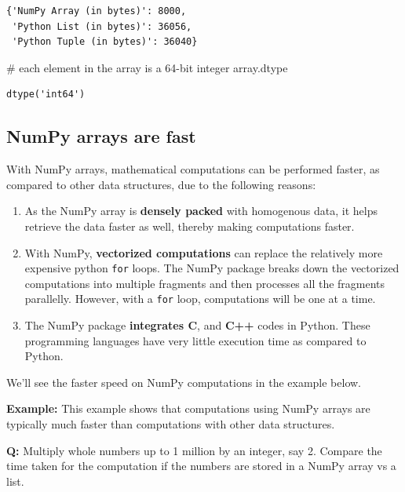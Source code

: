 \documentclass[
  letterpaper,
  DIV=11,
  numbers=noendperiod]{scrreprt}
\newenvironment{Shaded}{\begin{snugshade}}{\end{snugshade}}
\newcommand{\CommentTok}[1]{\textcolor[rgb]{0.37,0.37,0.37}{#1}}
\newcommand{\NormalTok}[1]{\textcolor[rgb]{0.00,0.23,0.31}{#1}}
\begin{document}
\begin{verbatim}
{'NumPy Array (in bytes)': 8000,
 'Python List (in bytes)': 36056,
 'Python Tuple (in bytes)': 36040}
\end{verbatim}

\begin{Shaded}
\begin{Highlighting}[]
\CommentTok{\# each element in the array is a 64{-}bit integer}
\NormalTok{array.dtype}
\end{Highlighting}
\end{Shaded}

\begin{verbatim}
dtype('int64')
\end{verbatim}

\hypertarget{numpy-arrays-are-fast}{%
\subsection{NumPy arrays are fast}\label{numpy-arrays-are-fast}}

With NumPy arrays, mathematical computations can be performed faster, as
compared to other data structures, due to the following reasons:

\begin{enumerate}
\def\labelenumi{\arabic{enumi}.}
\item
  As the NumPy array is \textbf{densely packed} with homogenous data, it
  helps retrieve the data faster as well, thereby making computations
  faster.
\item
  With NumPy, \textbf{vectorized computations} can replace the
  relatively more expensive python \texttt{for} loops. The NumPy package
  breaks down the vectorized computations into multiple fragments and
  then processes all the fragments parallelly. However, with a
  \texttt{for} loop, computations will be one at a time.
\item
  The NumPy package \textbf{integrates C}, and \textbf{C++} codes in
  Python. These programming languages have very little execution time as
  compared to Python.
\end{enumerate}

We'll see the faster speed on NumPy computations in the example below.

\textbf{Example:} This example shows that computations using NumPy
arrays are typically much faster than computations with other data
structures.

\textbf{Q:} Multiply whole numbers up to 1 million by an integer, say 2.
Compare the time taken for the computation if the numbers are stored in
a NumPy array vs a list.
\end{document}
